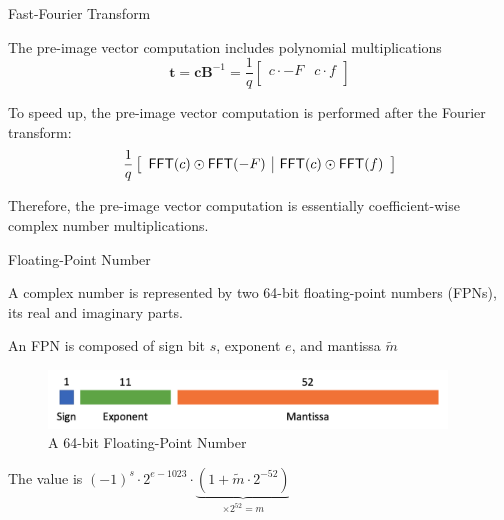 \begin{frame}{Fast-Fourier Transform}

The pre-image vector computation includes polynomial multiplications
\[
\textbf{t} = \mathbf{c} \mathbf{B}^{-1}
= \frac{1}{q} \left[ \begin{array}{c|c} c \cdot -F & c \cdot f \\ \end{array} \right]
\]
\pause

To speed up, the pre-image vector computation is performed after the Fourier transform:
\[
\frac{1}{q} \left[ \begin{array}{c|c} {\sf FFT}(c) \odot {\sf FFT}(-F) & {\sf FFT}(c) \odot {\sf FFT}(f) \end{array} \right]
\]
\pause

Therefore, the pre-image vector computation is essentially coefficient-wise complex number multiplications.
\end{frame}


\begin{frame}{Floating-Point Number}

A complex number is represented by two 64-bit floating-point numbers (FPNs), its real and imaginary parts.

\medskip
\pause
An FPN is composed of sign bit $s$, exponent $e$, and mantissa $\tilde{m}$

\begin{figure}
    \centering
    \includegraphics[width = 300pt]{Figure/fpu.png}
    \caption{A 64-bit Floating-Point Number}
    \label{fig:64bitfpr}
\end{figure}

\pause
The value is $(-1)^s \cdot 2^{e - 1023} \cdot \underbrace{(1 + \tilde{m} \cdot 2^{-52})}_{\times 2^{52} = m}$

\end{frame}



